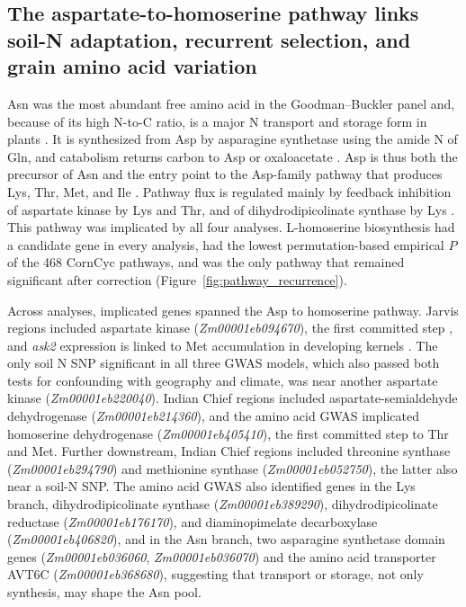\documentclass[namedate,unnumsec,webpdf,contemporary,large]{oup-authoring-template}
\begin{document}
\subsection{The aspartate-to-homoserine pathway links soil-N adaptation, recurrent selection, and grain amino acid variation}

Asn was the most abundant free amino acid in the Goodman--Buckler panel and, because of its high N-to-C ratio, is a major N transport and storage form in plants \citep{Lea2007Asparagine}. It is synthesized from Asp by asparagine synthetase using the amide N of Gln, and catabolism returns carbon to Asp or oxaloacetate \citep{Lea2007Asparagine}. Asp is thus both the precursor of Asn and the entry point to the Asp-family pathway that produces Lys, Thr, Met, and Ile \citep{Han2021Aspartate, Wang2018AspSeeds, Viola2001AspartatePathway}. Pathway flux is regulated mainly by feedback inhibition of aspartate kinase by Lys and Thr, and of dihydrodipicolinate synthase by Lys \citep{Azevedo2006AspPathway, Jander2009AspArabidopsis}. This pathway was implicated by all four analyses. L-homoserine biosynthesis had a candidate gene in every analysis, had the lowest permutation-based empirical $P$ of the 468 CornCyc pathways, and was the only pathway that remained significant after correction (Figure~\ref{fig:pathway_recurrence}).

Across analyses, implicated genes spanned the Asp to homoserine pathway. Jarvis regions included aspartate kinase (\textit{Zm00001eb094670}), the first committed step \citep{Viola2001AspartatePathway}, and \textit{ask2} expression is linked to Met accumulation in developing kernels \citep{Duo2026Ask2}. The only soil N SNP significant in all three GWAS models, which also passed both tests for confounding with geography and climate, was near another aspartate kinase (\textit{Zm00001eb220040}). Indian Chief regions included aspartate-semialdehyde dehydrogenase (\textit{Zm00001eb214360}), and the amino acid GWAS implicated homoserine dehydrogenase (\textit{Zm00001eb405410}), the first committed step to Thr and Met. Further downstream, Indian Chief regions included threonine synthase (\textit{Zm00001eb294790}) and methionine synthase (\textit{Zm00001eb052750}), the latter also near a soil-N SNP. The amino acid GWAS also identified genes in the Lys branch, dihydrodipicolinate synthase (\textit{Zm00001eb389290}), dihydrodipicolinate reductase (\textit{Zm00001eb176170}), and diaminopimelate decarboxylase (\textit{Zm00001eb406820}), and in the Asn branch, two asparagine synthetase domain genes (\textit{Zm00001eb036060}, \textit{Zm00001eb036070}) and the amino acid transporter AVT6C (\textit{Zm00001eb368680}), suggesting that transport or storage, not only synthesis, may shape the Asn pool.
\end{document}
